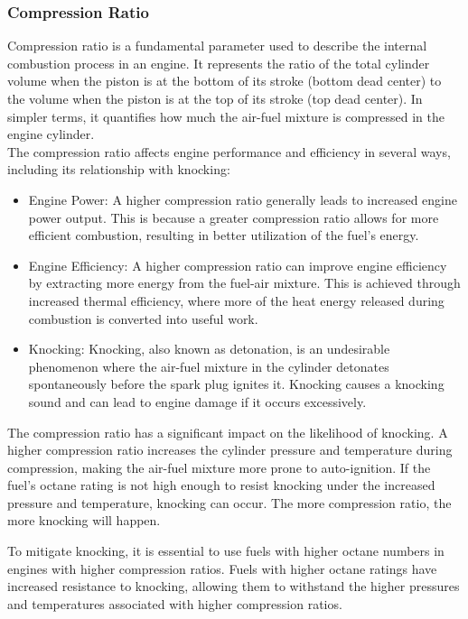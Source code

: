 \documentclass{article}
\begin{document}
\subsubsection*{Compression Ratio}
Compression ratio is a fundamental parameter used to describe the internal combustion process in an engine. It represents the ratio of the total cylinder volume when the piston is at the bottom of its stroke (bottom dead center) to the volume when the piston is at the top of its stroke (top dead center). In simpler terms, it quantifies how much the air-fuel mixture is compressed in the engine cylinder.\\

The compression ratio affects engine performance and efficiency in several ways, including its relationship with knocking:
\begin{itemize}
  \item Engine Power: A higher compression ratio generally leads to increased engine power output. This is because a greater compression ratio allows for more efficient combustion, resulting in better utilization of the fuel's energy.
  \item Engine Efficiency: A higher compression ratio can improve engine efficiency by extracting more energy from the fuel-air mixture. This is achieved through increased thermal efficiency, where more of the heat energy released during combustion is converted into useful work.
  \item Knocking: Knocking, also known as detonation, is an undesirable phenomenon where the air-fuel mixture in the cylinder detonates spontaneously before the spark plug ignites it. Knocking causes a knocking sound and can lead to engine damage if it occurs excessively.

\end{itemize}

The compression ratio has a significant impact on the likelihood of knocking. A higher compression ratio increases the cylinder pressure and temperature during compression, making the air-fuel mixture more prone to auto-ignition. If the fuel's octane rating is not high enough to resist knocking under the increased pressure and temperature, knocking can occur. The more compression ratio, the more knocking will happen.

To mitigate knocking, it is essential to use fuels with higher octane numbers in engines with higher compression ratios. Fuels with higher octane ratings have increased resistance to knocking, allowing them to withstand the higher pressures and temperatures associated with higher compression ratios.
\end{document}
